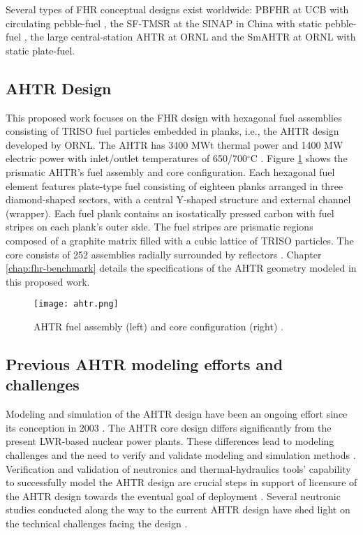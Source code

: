 Several types of \gls{FHR} conceptual designs exist worldwide: \gls{PBFHR} at 
\gls{UCB} with circulating pebble-fuel 
\cite{scarlat_current_2014,krumwiede_three-dimensional_2013}, the \gls{SF-TMSR} 
at the \gls{SINAP} in China with static pebble-fuel \cite{liu_preliminary_2016}, 
the large central-station \gls{AHTR} at \gls{ORNL} \cite{holcomb_core_2011, varma_ahtr_2012} and 
the \gls{SmAHTR} at ORNL \cite{greene_pre-conceptual_2010} with static plate-fuel. 

\subsection{\acrlong{AHTR} Design}
This proposed work focuses on the \gls{FHR} design with hexagonal fuel assemblies
consisting of \gls{TRISO} fuel particles embedded in planks, i.e., the 
\gls{AHTR} design developed by ORNL. 
The \gls{AHTR} has 3400 MWt thermal power and 1400 MW electric power with
inlet/outlet temperatures of 650/700$^{\circ}$C \cite{varma_ahtr_2012}.  
Figure \ref{fig:ahtr} shows the prismatic AHTR's fuel assembly and core 
configuration.  
Each hexagonal fuel element features plate-type fuel consisting of eighteen planks 
arranged in three diamond-shaped sectors, with a central Y-shaped structure 
and external channel (wrapper).
Each fuel plank contains an isostatically pressed carbon with fuel stripes 
on each plank's outer side.
The fuel stripes are prismatic regions composed of a graphite matrix filled with 
a cubic lattice of \gls{TRISO} particles. 
The core consists of 252 assemblies radially surrounded by reflectors
\cite{ramey_monte_2018}. 
Chapter \ref{chap:fhr-benchmark} details the specifications of the AHTR geometry
modeled in this proposed work.

\begin{figure}[]
    \centering
    \texttt{[image: ahtr.png]} 
    \caption{\acrlong{AHTR} fuel assembly (left) and core configuration (right) 
    \cite{ramey_monte_2018}.}
    \label{fig:ahtr}
\end{figure}

\subsection{Previous AHTR modeling efforts and challenges}
Modeling and simulation of the \gls{AHTR} design have been an ongoing effort 
since its conception in 2003 \cite{forsberg_molten-salt-cooled_2003}. 
The \gls{AHTR} core design differs significantly from the present \gls{LWR}-based 
nuclear power plants. 
These differences lead to modeling challenges and the need to verify and 
validate modeling and simulation methods \cite{ramey_monte_2018}. 
Verification and validation of neutronics and thermal-hydraulics tools' 
capability to successfully model the \gls{AHTR} design are crucial steps 
in support of licensure of the \gls{AHTR} design towards the eventual goal 
of deployment \cite{rahnema_phenomena_2019,rahnema_current_2015}. 
Several neutronic studies conducted along the way to the current \gls{AHTR} 
design have shed light on the technical challenges facing the design 
\cite{ramey_monte_2018,holcomb_fluoride_2013,greene_pre-conceptual_2010}. 


